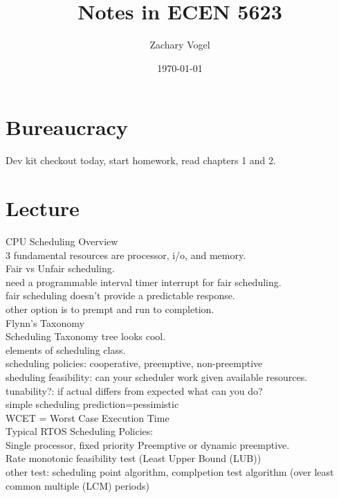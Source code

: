 \documentclass{article}
\author{Zachary Vogel}
\date{\today}
\title{Notes in ECEN 5623}
\begin{document}
\maketitle


\section*{Bureaucracy}
Dev kit checkout today, start homework, read chapters 1 and 2.


\section*{Lecture}
CPU Scheduling Overview\\
3 fundamental resources are processor, i/o, and memory.\\

Fair vs Unfair scheduling.\\
need a programmable interval timer interrupt for fair scheduling.\\
fair scheduling doesn't provide a predictable response.\\

other option is to prempt and run to completion.\\

Flynn's Taxonomy\\


Scheduling Taxonomy tree looks cool.\\

elements of scheduling class.\\
scheduling policies: cooperative, preemptive, non-preemptive\\
sheduling feasibility: can your scheduler work given available resources.\\
tunability?: if actual differs from expected what can you do?\\

simple scheduling prediction=pessimistic\\

WCET = Worst Case Execution Time\\

Typical RTOS Scheduling Policies:\\
Single processor, fixed priority Preemptive or dynamic preemptive.\\
Rate monotonic feasibility test (Least Upper Bound (LUB))\\
other test: scheduling point algorithm, complpetion test algorithm (over least common multiple (LCM) periods)\\
\end{document}

